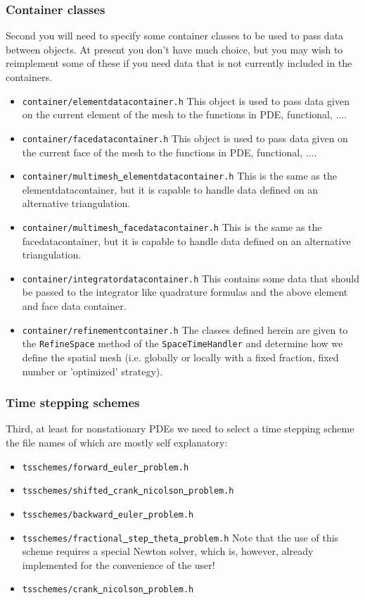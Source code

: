 \subsubsection{Container classes}
Second you will need to specify some container classes to be used to 
pass data between objects. At present you don't have much choice, but you may wish 
to reimplement some of these if you need data that is not currently included in 
the containers.
\begin{itemize}
\item \texttt{container/elementdatacontainer.h} This object is used to pass data 
  given on the current element of the mesh to the functions in PDE, functional, 
  $\ldots$. 
\item \texttt{container/facedatacontainer.h} This object is used to pass data 
  given on the current face of the mesh to the functions in PDE, functional, 
  $\ldots$. 
\item \texttt{container/multimesh\underline{ }elementdatacontainer.h} This is the same as the 
  elementdatacontainer, but it
  is capable to handle data defined on an alternative triangulation.
\item \texttt{container/multimesh\underline{ }facedatacontainer.h} This is the same as the
  facedatacontainer, but it
  is capable to handle data defined on an alternative triangulation.
\item \texttt{container/integratordatacontainer.h} This contains some data that 
  should be passed to the integrator like quadrature formulas and the above element and 
  face data container.
\item \texttt{container/refinementcontainer.h} The classes defined herein are given to the \texttt{RefineSpace} method of the \texttt{SpaceTimeHandler} and determine how we define the spatial mesh (i.e. globally or locally with a fixed fraction, fixed number or 'optimized' strategy).
\end{itemize}

\subsubsection{Time stepping schemes}
Third, at least for nonstationary PDEs we need to select a time stepping scheme
the file names of which are mostly self explanatory:
\begin{itemize}
\item \texttt{tsschemes/forward\underline{ }euler\underline{ }problem.h}
\item \texttt{tsschemes/shifted\underline{ }crank\underline{ }nicolson\underline{ }problem.h}
\item \texttt{tsschemes/backward\underline{ }euler\underline{ }problem.h}
\item \texttt{tsschemes/fractional\underline{ }step\underline{ }theta\underline{ }problem.h} Note that the use of this scheme requires a special Newton solver, which is, however, already
implemented for the convenience of the user!
\item \texttt{tsschemes/crank\underline{ }nicolson\underline{ }problem.h}
\end{itemize}

